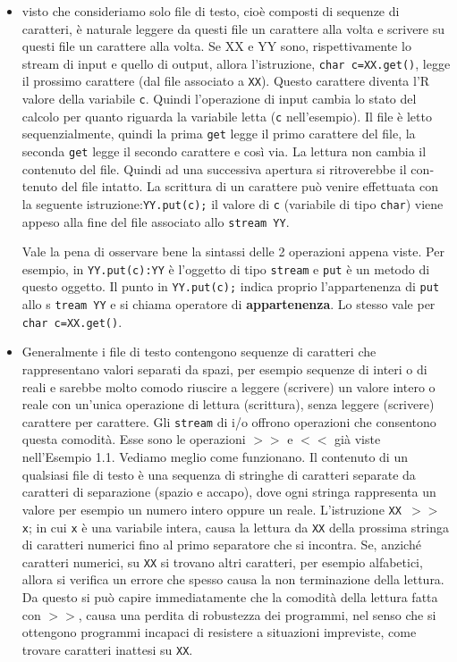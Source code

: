 \begin{itemize}
\item visto che consideriamo solo file di testo, cioè composti di sequenze di caratteri, è naturale leggere da questi file un carattere alla volta e scrivere su questi file un carattere alla volta. 
Se XX e YY sono, rispettivamente lo stream di input e quello di output, allora l'istruzione, \texttt{char c=XX.get()}, legge il prossimo carattere (dal file associato a \texttt{XX}).
Questo carattere diventa l'R valore della variabile \texttt{c}.
Quindi l'operazione di input cambia lo stato del calcolo per quanto riguarda la variabile letta (\texttt{c} nell'esempio).
Il file è letto sequenzialmente, quindi la prima \texttt{get} legge il primo carattere del file, la seconda \texttt{get} legge il secondo carattere e così via. La lettura non cambia il contenuto del file.
Quindi ad una successiva apertura si ritroverebbe il con­tenuto del file intatto.
La scrittura di un carattere può venire effettuata con la seguente istruzione:\texttt{YY.put(c);} il valore di \texttt{c} (variabile di tipo \texttt{char}) viene appeso alla fine del file associato allo \texttt{stream YY}.

\noindent Vale la pena di osservare bene la sintassi delle 2 operazioni appena viste.
Per esempio, in \texttt{YY.put(c):YY} è l'oggetto di tipo \texttt{stream} e \texttt{put} è un metodo di questo oggetto.
Il punto in \texttt{YY.put(c);} indica proprio l'appartenenza di \texttt{put} allo s \texttt{tream YY} e si chiama operatore di \textbf{appartenenza}.
Lo stesso vale per \texttt{char c=XX.get()}.

\item Generalmente i file di testo contengono sequenze di caratteri che rappresentano valori separati da spazi, per esempio sequenze di interi o di reali e sarebbe molto comodo riuscire a leggere (scrivere) un valore intero o reale con un'unica operazione di lettura (scrittura), senza leggere (scrivere) carattere per carattere.
Gli \texttt{stream} di i/o offrono operazioni che consentono questa comodità.
Esse sono le operazioni $>>$ e $<<$ già viste nell'Esempio 1.1.
Vediamo meglio come funzionano.
Il contenuto di un qualsiasi file di testo è una sequenza di stringhe di caratteri separate da caratteri di separazione (spazio e accapo), dove ogni stringa rappresenta un valore per esempio un numero intero oppure un reale.
L'istruzione \texttt{XX $>>$ x}; in cui \texttt{x} è una variabile intera, causa la lettura da \texttt{XX} della prossima stringa di caratteri numerici fino al primo separatore che si incontra.
Se, anziché caratteri numerici, su \texttt{XX} si trovano altri caratteri, per esempio alfabetici, allora si verifica un errore che spesso causa la non terminazione della lettura.
Da questo si può capire immediatamente che la comodità della lettura fatta con $>>$, causa una perdita di robustezza dei programmi, nel senso che si ottengono programmi incapaci di resistere a situazioni impreviste, come trovare caratteri inattesi su \texttt{XX}.


\end{itemize}
